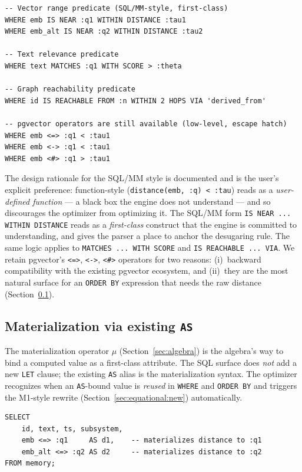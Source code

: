 \documentclass[sigconf,nonacm,review]{acmart}
\theoremstyle{plain}
\theoremstyle{definition}
\theoremstyle{remark}
\begin{document}
\begin{lstlisting}
-- Vector range predicate (SQL/MM-style, first-class)
WHERE emb IS NEAR :q1 WITHIN DISTANCE :tau1
WHERE emb_alt IS NEAR :q2 WITHIN DISTANCE :tau2

-- Text relevance predicate
WHERE text MATCHES :q1 WITH SCORE > :theta

-- Graph reachability predicate
WHERE id IS REACHABLE FROM :n WITHIN 2 HOPS VIA 'derived_from'

-- pgvector operators are still available (low-level, escape hatch)
WHERE emb <=> :q1 < :tau1
WHERE emb <-> :q1 < :tau1
WHERE emb <#> :q1 > :tau1
\end{lstlisting}

The design rationale for the SQL/MM style is documented and is
the user's explicit preference: function-style
(\texttt{distance(emb, :q) < :tau}) reads as a \emph{user-defined
function} --- a black box the engine does not understand ---
and so discourages the optimizer from optimizing it. The
SQL/MM form \texttt{IS NEAR ... WITHIN DISTANCE} reads as a
\emph{first-class} construct that the engine is committed to
understanding, and gives the parser a place to anchor the
desugaring rule. The same logic applies to \texttt{MATCHES ...
WITH SCORE} and \texttt{IS REACHABLE ... VIA}. We retain
pgvector's \texttt{<=>}, \texttt{<->}, \texttt{<\#>} operators
for two reasons: (i)~backward compatibility with the existing
pgvector ecosystem, and (ii)~they are the most natural surface
for an \texttt{ORDER BY} expression that needs the raw
distance (Section~\ref{sec:sql:materialization}).

\subsection{Materialization via existing \texttt{AS}}\label{sec:sql:materialization}

The materialization operator $\mu$ (Section~\ref{sec:algebra})
is the algebra's way to bind a computed value as a first-class
attribute. The SQL surface does \emph{not} add a new
\texttt{LET} clause; the existing \texttt{AS} alias is the
materialization syntax. The optimizer recognizes when an
\texttt{AS}-bound value is \emph{reused} in \texttt{WHERE} and
\texttt{ORDER BY} and triggers the M1-style rewrite
(Section~\ref{sec:equational:new}) automatically.

\begin{lstlisting}
SELECT
    id, text, ts, subsystem,
    emb <=> :q1     AS d1,    -- materializes distance to :q1
    emb_alt <=> :q2 AS d2     -- materializes distance to :q2
FROM memory;
\end{lstlisting}
\end{document}
